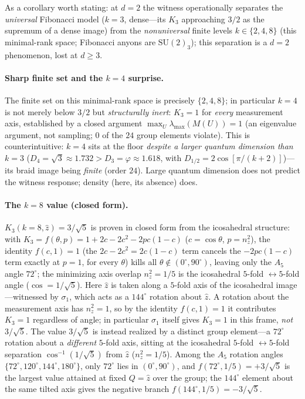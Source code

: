 \documentclass[aps,prx,reprint,amsmath,amssymb,floatfix,nofootinbib,superscriptaddress]{revtex4-2}
\begin{document}
As a corollary worth stating: at $d=2$ the witness operationally separates the
\emph{universal} Fibonacci model ($k=3$, dense---its $K_3$ approaching $3/2$ as the
supremum of a dense image) from the \emph{nonuniversal} finite levels
$k \in \{2,4,8\}$ (this minimal-rank space; Fibonacci anyons are $\mathrm{SU}(2)_3$); this separation is a
$d=2$ phenomenon, lost at $d \ge 3$.

\paragraph{Sharp finite set and the $k=4$ surprise.}
The finite set on this minimal-rank space is precisely $\{2,4,8\}$; in particular $k=4$ is not merely below
$3/2$ but \emph{structurally inert}: $K_3 = 1$ for \emph{every} measurement axis,
established by a closed argument $\max_U \lambda_{\max}(M(U)) = 1$ (an eigenvalue
argument, not sampling; $0$ of the $24$ group elements violate). This is
counterintuitive: $k=4$ sits at the floor \emph{despite a larger quantum dimension
than $k=3$} ($D_4 = \sqrt3 \approx 1.732 > D_3 = \varphi \approx 1.618$, with
$D_{1/2} = 2\cos[\pi/(k+2)]$)---its braid image being \emph{finite} (order $24$).
Large quantum dimension does not predict the witness response; density (here, its
absence) does.

\paragraph{The $k=8$ value (closed form).}
$K_3(k{=}8, \hat z) = 3/\sqrt5$ is proven in closed form from the icosahedral
structure: with $K_3 = f(\theta, p) = 1 + 2c - 2c^2 - 2pc(1-c)$ ($c = \cos\theta$,
$p = n_z^2$), the identity $f(c,1) = 1$ (the $2c-2c^2=2c(1-c)$ term cancels the
$-2pc(1-c)$ term exactly at $p=1$, for every $\theta$) kills all $\theta \notin
(0^\circ, 90^\circ)$,
leaving only the $A_5$ angle $72^\circ$; the minimizing axis overlap $n_z^2 = 1/5$ is
the icosahedral $5$-fold $\leftrightarrow 5$-fold angle ($\cos = 1/\sqrt5$). Here
$\hat z$ is taken along a $5$-fold axis of the icosahedral image---witnessed by
$\sigma_1$, which acts as a $144^\circ$ rotation about $\hat z$. A rotation about
the measurement axis has $n_z^2=1$, so by the identity $f(c,1)=1$ it contributes
$K_3=1$ regardless of angle; in particular $\sigma_1$ itself gives $K_3=1$ in this
frame, \emph{not} $3/\sqrt5$. The value $3/\sqrt5$ is instead realized by a
distinct group element---a $72^\circ$ rotation about a \emph{different} $5$-fold
axis, sitting at the icosahedral $5$-fold $\leftrightarrow 5$-fold separation
$\cos^{-1}(1/\sqrt5)$ from $\hat z$ ($n_z^2=1/5$). Among the $A_5$ rotation angles
$\{72^\circ,120^\circ,144^\circ,180^\circ\}$, only $72^\circ$ lies in
$(0^\circ,90^\circ)$, and $f(72^\circ,1/5) = +3/\sqrt5$ is the largest value
attained at fixed $Q=\hat z$ over the group; the $144^\circ$ element about the
same tilted axis gives the negative branch $f(144^\circ,1/5) = -3/\sqrt5$.
\end{document}
